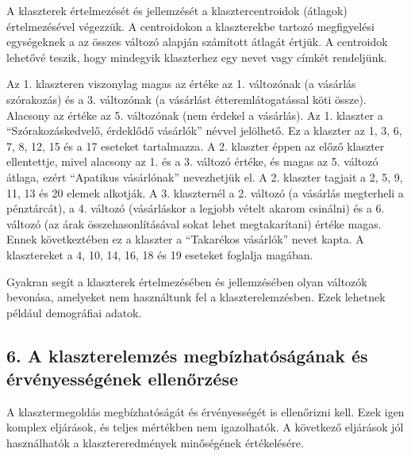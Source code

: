 \documentclass[
  letterpaper,
]{krantz}
\begin{document}
A klaszterek értelmezését és jellemzését a klasztercentroidok (átlagok)
értelmezésével végezzük. A centroidokon a klaszterekbe tartozó
megfigyelési egységeknek a az összes változó alapján számított átlagát
értjük. A centroidok lehetővé teszik, hogy mindegyik klaszterhez egy
nevet vagy címkét rendeljünk.

Az 1. klaszteren viszonylag magas az értéke az 1. változónak (a vásárlás
szórakozás) és a 3. változónak (a vásárlást étteremlátogatással köti
össze). Alacsony az értéke az 5. változónak (nem érdekel a vásárlás). Az
1. klaszter a ``Szórakozáskedvelő, érdeklődő vásárlók'' névvel
jelölhető. Ez a klaszter az 1, 3, 6, 7, 8, 12, 15 és a 17 eseteket
tartalmazza. A 2. klaszter éppen az előző klaszter ellentettje, mivel
alacsony az 1. és a 3. változó értéke, és magas az 5. változó átlaga,
ezért ``Apatikus vásárlónak'' nevezhetjük el. A 2. klaszter tagjait a 2,
5, 9, 11, 13 és 20 elemek alkotják. A 3. klaszternél a 2. változó (a
vásárlás megterheli a pénztárcát), a 4. változó (vásárláskor a legjobb
vételt akarom csinálni) és a 6. változó (az árak összehasonlításával
sokat lehet megtakarítani) értéke magas. Ennek következtében ez a
klaszter a ``Takarékos vásárlók'' nevet kapta. A klasztereket a 4, 10,
14, 16, 18 és 19 eseteket foglalja magában.

Gyakran segít a klaszterek értelmezésében és jellemzésében olyan
változók bevonása, amelyeket nem használtunk fel a klaszterelemzésben.
Ezek lehetnek például demográfiai adatok.

\hypertarget{a-klaszterelemzuxe9s-megbuxedzhatuxf3suxe1guxe1nak-uxe9s-uxe9rvuxe9nyessuxe9guxe9nek-ellenux151rzuxe9se}{%
\subsection{6. A klaszterelemzés megbízhatóságának és érvényességének
ellenőrzése}\label{a-klaszterelemzuxe9s-megbuxedzhatuxf3suxe1guxe1nak-uxe9s-uxe9rvuxe9nyessuxe9guxe9nek-ellenux151rzuxe9se}}

A klasztermegoldás megbízhatóságát és érvényességét is ellenőrizni kell.
Ezek igen komplex eljárások, és teljes mértékben nem igazolhatók. A
következő eljárások jól használhatók a klasztereredmények minőségének
értékelésére.
\end{document}
